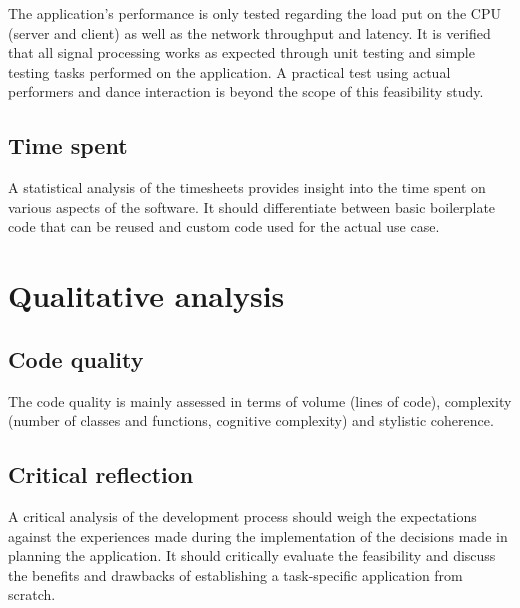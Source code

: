 The application's performance is only tested regarding the load put on the \ac{CPU} (server and client) as well as the network throughput and latency. It is verified that all signal processing works as expected through unit testing and simple testing tasks performed on the application. A practical test using actual performers and dance interaction is beyond the scope of this feasibility study.

\subsection{Time spent}

A statistical analysis of the timesheets provides insight into the time spent on various aspects of the software. It should differentiate between basic boilerplate code that can be reused and custom code used for the actual use case.

\section{Qualitative analysis}

\subsection{Code quality}

The code quality is mainly assessed in terms of volume (lines of code), complexity (number of classes and functions, cognitive complexity) and stylistic coherence.

\subsection{Critical reflection}

A critical analysis of the development process should weigh the expectations against the experiences made during the implementation of the decisions made in planning the application. It should critically evaluate the feasibility and discuss the benefits and drawbacks of establishing a task-specific application from scratch.

